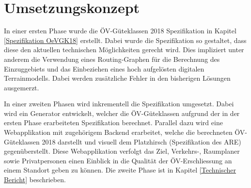 
\section{Umsetzungskonzept}
\label{Umsetzungskonzept}

In einer ersten Phase wurde die \acs{ÖV}-Güteklassen 2018 Spezifikation in Kapitel \ref{Spezifikation OeVGK18} erstellt.
Dabei wurde die Spezifikation so gestaltet, dass diese den aktuellen technischen Möglichkeiten gerecht wird.
Dies impliziert unter anderem die Verwendung eines Routing-Graphen für die Berechnung des Einzuggebiets und das Einbeziehen eines hoch aufgelösten digitalen Terrainmodells.
Dabei werden zusätzliche Fehler in den bisherigen Lösungen ausgemerzt.

In einer zweiten Phasen wird inkrementell die Spezifikation umgesetzt.
Dabei wird ein Generator entwickelt, welcher die \acs{ÖV}-Güteklassen aufgrund der in der ersten Phase erarbeiteten Spezifikation berechnet.
Parallel dazu wird eine Webapplikation mit zugehörigem Backend erarbeitet, welche die berechneten \acs{ÖV}-Güteklassen 2018 darstellt und visuell dem Platzhirsch (Spezifikation des \acl{ARE}) gegenüberstellt.
Diese Webapplikation verfolgt das Ziel, Verkehrs-, Raumplaner sowie Privatpersonen einen Einblick in die Qualität der ÖV-Erschliessung an einem Standort geben zu können.
Die zweite Phase ist in Kapitel \ref{Technischer Bericht} beschrieben.
